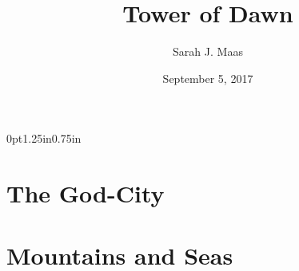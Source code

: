 \documentclass[12pt, openany]{book}
\title{Tower of Dawn}
\author{Sarah J. Maas}
\date{September 5, 2017}
\begin{document}


\blankpage

\blankpage




\tableofcontents

\newpage


\newpage %
\pdfpagewidth=5.5in \pdfpageheight=8.25in \eject %
\titlespacing*{\chapter} {0pt}{1.25in}{0.75in} %

\part{The God-City}





























\part{Mountains and Seas}













































\end{document}
